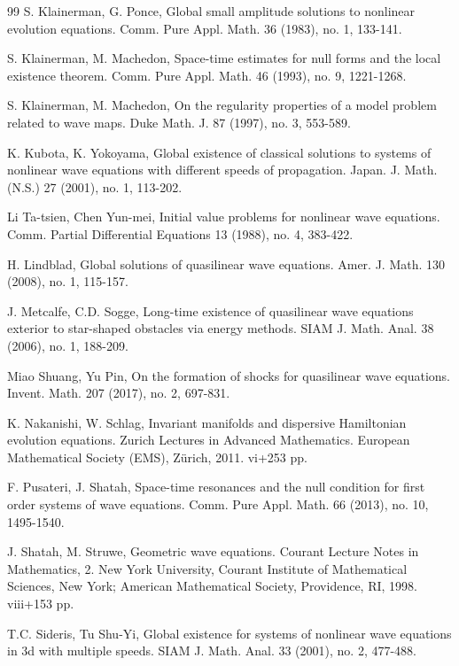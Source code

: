 \documentclass[11pt,twoside]{article}
\theoremstyle{plain}
\theoremstyle{definition}
\numberwithin{equation}{section}
\begin{document}
\begin{thebibliography}{99}
 S. Klainerman, G. Ponce, Global small amplitude solutions to nonlinear evolution equations. Comm. Pure Appl. Math. 36 (1983), no. 1, 133-141.

 S. Klainerman, M. Machedon, Space-time estimates for null forms and the local existence theorem.
Comm. Pure Appl. Math. 46 (1993), no. 9, 1221-1268.

 S. Klainerman, M. Machedon, On the regularity properties of a model problem related to wave maps.
Duke Math. J. 87 (1997), no. 3, 553-589.


 K. Kubota, K. Yokoyama, Global existence of classical solutions to systems of nonlinear wave equations
with different speeds of propagation. Japan. J. Math. (N.S.) 27 (2001), no. 1, 113-202.

 Li Ta-tsien, Chen Yun-mei, Initial value problems for nonlinear wave equations. Comm. Partial Differential Equations 13 (1988), no. 4, 383-422.

 H. Lindblad, Global solutions of quasilinear wave equations. Amer. J. Math. 130 (2008), no. 1, 115-157.

J. Metcalfe, C.D. Sogge, Long-time existence of quasilinear wave equations exterior to star-shaped obstacles via energy methods.
SIAM J. Math. Anal. 38 (2006), no. 1, 188-209.

 Miao Shuang, Yu Pin, On the formation of shocks for quasilinear wave equations. Invent. Math. 207 (2017), no. 2, 697-831.



 K. Nakanishi, W. Schlag,  Invariant manifolds and dispersive Hamiltonian evolution equations.
Zurich Lectures in Advanced Mathematics. European Mathematical Society (EMS), Z\"urich, 2011. vi+253 pp.

 F. Pusateri, J. Shatah,  Space-time resonances and the null condition for first order systems of wave equations.
Comm. Pure Appl. Math. 66 (2013), no. 10, 1495-1540.

J. Shatah, M. Struwe, Geometric wave equations. Courant Lecture Notes in Mathematics, 2.
New York University, Courant Institute of Mathematical Sciences, New York; American Mathematical Society, Providence, RI,
1998. viii+153 pp.

 T.C. Sideris, Tu Shu-Yi, Global existence for systems of nonlinear wave equations in 3d with multiple speeds.
SIAM J. Math. Anal. 33 (2001), no. 2, 477-488.



\end{thebibliography}
\end{document}
